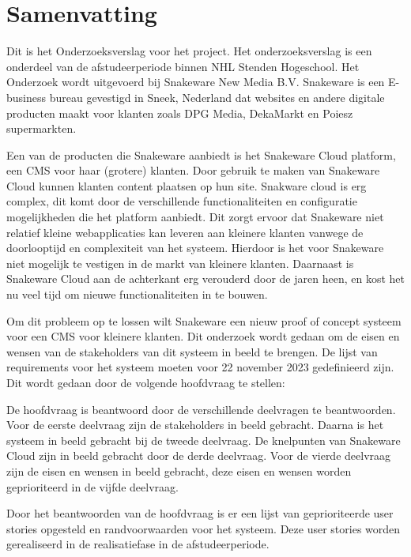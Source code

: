 \chapter*{Samenvatting}
Dit is het Onderzoeksverslag voor het  project.
Het onderzoeksverslag is een onderdeel van de afstudeerperiode binnen NHL Stenden Hogeschool.
Het Onderzoek wordt uitgevoerd bij Snakeware New Media B.V. 
Snakeware is een E-business bureau gevestigd in Sneek, Nederland dat websites en andere digitale producten maakt voor klanten zoals DPG Media, DekaMarkt en Poiesz supermarkten.

\whitespace
Een van de producten die Snakeware aanbiedt is het Snakeware Cloud platform, een \gls{CMS} voor haar (grotere) klanten.
Door gebruik te maken van Snakeware Cloud kunnen klanten content plaatsen op hun site.
Snakware cloud is erg complex, dit komt door de verschillende functionaliteiten en configuratie mogelijkheden die het platform aanbiedt.
Dit zorgt ervoor dat Snakeware niet relatief kleine webapplicaties kan leveren aan kleinere klanten vanwege de doorlooptijd en complexiteit van het systeem.
Hierdoor is het voor Snakeware niet mogelijk te vestigen in de markt van kleinere klanten.
Daarnaast is Snakeware Cloud aan de achterkant erg verouderd door de jaren heen, en kost het nu veel tijd om nieuwe functionaliteiten in te bouwen.

\whitespace
Om dit probleem op te lossen wilt Snakeware een nieuw proof of concept systeem voor een \gls{CMS} voor kleinere klanten.
Dit onderzoek wordt gedaan om de eisen en wensen van de stakeholders van dit systeem in beeld te brengen.
De lijst van requirements voor het systeem moeten voor 22 november 2023 gedefinieerd zijn.
Dit wordt gedaan door de volgende hoofdvraag te stellen:

\begin{center}
    \textit{\MainQuestion}
\end{center}

\whitespace
De hoofdvraag is beantwoord door de verschillende deelvragen te beantwoorden.
Voor de eerste deelvraag zijn de stakeholders in beeld gebracht.
Daarna is het systeem in beeld gebracht bij de tweede deelvraag.
De knelpunten van Snakeware Cloud zijn in beeld gebracht door de derde deelvraag.
Voor de vierde deelvraag zijn de eisen en wensen in beeld gebracht, deze eisen en wensen worden geprioriteerd in de vijfde deelvraag.

\whitespace
Door het beantwoorden van de hoofdvraag is er een lijst van geprioriteerde user stories opgesteld en randvoorwaarden voor het systeem.
Deze user stories worden gerealiseerd in de realisatiefase in de afstudeerperiode.
